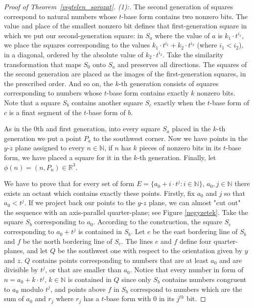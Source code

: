\documentclass[10pt,a4paper]{amsart}
\newcommand{\R}{\mathbb{R}}
\begin{document}
\begin{proof}[Proof of Theorem~\ref{vegtelen_sorozat}. (1):]
    The second generation of squares correspond to natural numbers whose $t$-base form contains two nonzero bits. The value and place of the smallest nonzero bit defines that first-generation square in which we put our second-generation square: in $S_a$ where the value of $a$ is $k_1 \cdot t^{i_1}$, we place the squares corresponding to the values $k_1 \cdot t^{i_1} + k_2 \cdot t^{i_2}$ (where $i_1<i_2$), in a diagonal, ordered by the absolute value of $k_2\cdot t^{i_2}$. Take the similarity transformation that maps $S_0$ onto $S_a$ and preserves all directions. The squares of the second generation are placed as the images of the first-generation squares, in the prescribed order. And so on, the $k$-th generation consists of squares corresponding to numbers whose $t$-base form contains exactly $k$ nonzero bits. Note that a square $S_b$ contains another square $S_c$ exactly when the $t$-base form of $c$ is a finat segment of the $t$-base form of $b$. 
    
    As in the 0th and first generation, into every square $S_a$ placed in the $k$-th generation we put a point $P_a$ to the southwest corner. Now we have points in the $y$-$z$ plane assigned to every $n\in\mathbb{N}$, if $n$ has $k$ pieces of nonzero bits in its $t$-base form, we have placed a square for it in the $k$-th generation. Finally, let $\phi (n)=(n,P_n)\in\R^3.$
    
    We have to prove that for every set of form $E = \{a_0+ i \cdot t^j: i \in \mathbb{N}\}$, $a_0, j \in \mathbb{N}$ there exists an octant which contains exactly these points. Firstly, fix $a_0$ and $j$ so that $a_0<t^j$. If we project back our points to the $y$-$z$ plane, we can almost "cut out" the sequence with an axis-parallel quarter-plane; see Figure \ref{negyzetek}. Take the square $S_b$ corresponding to $a_0$. According to the construction, the square $S_c$ corresponding to $a_0 + t^j$ is contained in $S_b$. Let $e$ be the east bordering line of $S_b$ and $f$ be the north bordering line of $S_c$. The lines $e$ and $f$ define four quarter-planes, and let $Q$ be the southwest one with respect to the orientation given by $y$ and $z$. $Q$ contains points corresponding to numbers that are at least $a_0$ and are divisible by $t^j$, or that are smaller than $a_0$. Notice that every number in form of $n=a_0+k \cdot t^j$, $k\in \mathbb{N}$ is contained in $Q$ since only $S_b$ contains numbers congruent to $a_0$ modulo $t^j$, and points above $f$ in $S_b$ correspond to numbers which are the sum of $a_0$ and $r_j$ where $r_j$ has a $t$-base form with $0$ in its $j^{th}$ bit. 
    

\end{proof}
\end{document}
